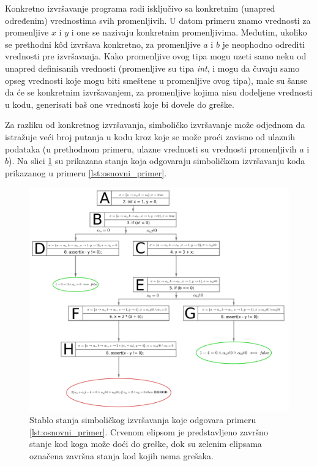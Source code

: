 \documentclass[12pt,oneside]{memoir}
\begin{document}
Konkretno izvršavanje programa radi isključivo sa konkretnim (unapred određenim) vrednostima svih promenljivih. U datom primeru znamo vrednosti za promenljive $x$ i $y$ i one se nazivaju konkretnim promenljivima. Međutim, ukoliko se prethodni k\^od izvršava konkretno, za promenljive $a$ i $b$ je neophodno odrediti vrednosti pre izvršavanja. Kako promenljive ovog tipa mogu uzeti samo neku od unapred definisanih vrednosti (promenljive su tipa \textit{int}, i mogu da čuvaju samo opseg vrednosti koje mogu biti smeštene u promenljive ovog tipa), male su šanse da će se konkretnim izvršavanjem, za promenljive kojima nisu dodeljene vrednosti u kodu, generisati baš one vrednosti koje bi dovele do greške. 

Za razliku od konkretnog izvršavanja, simboličko izvršavanje može odjednom da istražuje veći broj putanja u kodu kroz koje se može proći zavisno od ulaznih podataka (u prethodnom primeru, ulazne vrednosti su vrednosti promenljivih $a$ i $b$). Na slici \ref{fig:osnovni_primer} su prikazana stanja koja odgovaraju simboličkom izvršavanju koda prikazanog u primeru \ref{lst:osnovni_primer}. 


\begin{figure}[ht]
    \centering
    \includegraphics[width=1.0\linewidth]{osnovni_primer.png}
    \caption{Stablo stanja simboličkog izvršavanja koje odgovara primeru \ref{lst:osnovni_primer}. Crvenom elipsom je predstavljeno završno stanje kod koga može doći do greške, dok su zelenim elipsama označena završna stanja kod kojih nema grešaka.}
    \label{fig:osnovni_primer}
\end{figure}
\end{document}
